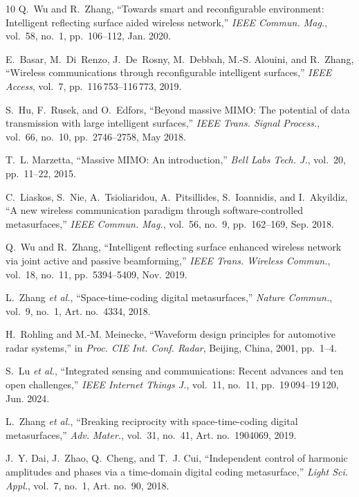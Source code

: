 \documentclass[journal]{IEEEtran}
\begin{document}
\begin{thebibliography}{10}
Q.~Wu and R.~Zhang, ``Towards smart and reconfigurable environment: Intelligent reflecting surface aided wireless network,'' \emph{IEEE Commun. Mag.}, vol.~58, no.~1, pp.~106--112, Jan. 2020.

E.~Basar, M.~Di~Renzo, J.~De~Rosny, M.~Debbah, M.-S. Alouini, and R.~Zhang, ``Wireless communications through reconfigurable intelligent surfaces,'' \emph{IEEE Access}, vol.~7, pp.~116\,753--116\,773, 2019.

S.~Hu, F.~Rusek, and O.~Edfors, ``Beyond massive MIMO: The potential of data transmission with large intelligent surfaces,'' \emph{IEEE Trans. Signal Process.}, vol.~66, no.~10, pp.~2746--2758, May 2018.

T.~L. Marzetta, ``Massive MIMO: An introduction,'' \emph{Bell Labs Tech. J.}, vol.~20, pp.~11--22, 2015.

C.~Liaskos, S.~Nie, A.~Tsioliaridou, A.~Pitsillides, S.~Ioannidis, and I.~Akyildiz, ``A new wireless communication paradigm through software-controlled metasurfaces,'' \emph{IEEE Commun. Mag.}, vol.~56, no.~9, pp.~162--169, Sep. 2018.

Q.~Wu and R.~Zhang, ``Intelligent reflecting surface enhanced wireless network via joint active and passive beamforming,'' \emph{IEEE Trans. Wireless Commun.}, vol.~18, no.~11, pp.~5394--5409, Nov. 2019.

L.~Zhang \emph{et al.}, ``Space-time-coding digital metasurfaces,'' \emph{Nature Commun.}, vol.~9, no.~1, Art. no.~4334, 2018.

H.~Rohling and M.-M. Meinecke, ``Waveform design principles for automotive radar systems,'' in \emph{Proc. CIE Int. Conf. Radar}, Beijing, China, 2001, pp.~1--4.

S.~Lu \emph{et al.}, ``Integrated sensing and communications: Recent advances and ten open challenges,'' \emph{IEEE Internet Things J.}, vol.~11, no.~11, pp.~19\,094--19\,120, Jun. 2024.

L.~Zhang \emph{et al.}, ``Breaking reciprocity with space-time-coding digital metasurfaces,'' \emph{Adv. Mater.}, vol.~31, no.~41, Art. no.~1904069, 2019.

J.~Y. Dai, J.~Zhao, Q.~Cheng, and T.~J. Cui, ``Independent control of harmonic amplitudes and phases via a time-domain digital coding metasurface,'' \emph{Light Sci. Appl.}, vol.~7, no.~1, Art. no.~90, 2018.


\end{thebibliography}
\end{document}
